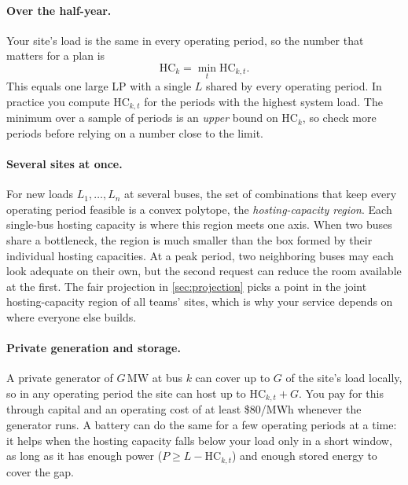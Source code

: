 \documentclass[10pt]{article}
\newcommand{\MW}{\ensuremath{\,\mathrm{MW}}}
\begin{document}
\paragraph{Over the half-year.} Your site's load is the same in every operating
period, so
the number that matters for a plan is
\[
  \mathrm{HC}_k = \min_t \mathrm{HC}_{k,t}.
\]
This equals one large LP with a single $L$ shared by every operating period. In practice
you compute $\mathrm{HC}_{k,t}$ for the periods with the highest system load. The
minimum over a sample of periods is an \emph{upper} bound on $\mathrm{HC}_k$, so
check more periods before relying on a number close to the limit.

\paragraph{Several sites at once.} For new loads $L_1, \dots, L_n$ at several
buses, the set of combinations that keep every operating period feasible is a convex
polytope, the \emph{hosting-capacity region}. Each single-bus hosting capacity
is where this region meets one axis. When two buses share a bottleneck, the
region is much smaller than the box formed by their individual hosting
capacities. At a peak period, two neighboring buses may each look adequate
on their own, but the second request can reduce the room available at the
first. The fair projection in
\cref{sec:projection} picks a point in the joint hosting-capacity region of all
teams' sites, which is why your service depends on where everyone else builds.

\paragraph{Private generation and storage.} A private generator of $G$\MW{} at
bus $k$ can cover up to $G$ of the site's load locally, so in any operating period the site
can host up to $\mathrm{HC}_{k,t} + G$. You pay for this through capital and
an operating cost of at least \$80/MWh whenever the generator runs. A battery
can do the same for a few operating periods at a time: it helps when the hosting capacity
falls below your load only in a short window, as long as it has enough power
($P \ge L - \mathrm{HC}_{k,t}$) and enough stored energy to cover the gap.
\end{document}
